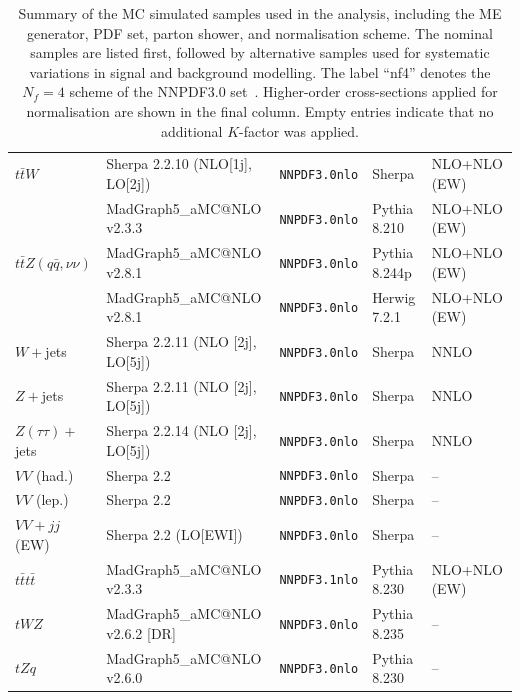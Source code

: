\begin{table}[h!]
\begin{tabular}{|lllll|}
$t\bar{t}W$   & Sherpa 2.2.10 (NLO[1j], LO[2j]) & \verb|NNPDF3.0nlo| & Sherpa & NLO+NLO (EW) \\
              & MadGraph5\_aMC@NLO v2.3.3 & \verb|NNPDF3.0nlo| & Pythia 8.210 & NLO+NLO (EW) \\
$t\bar{t}Z (q\bar{q}, \nu\nu)$ & MadGraph5\_aMC@NLO v2.8.1 & \verb|NNPDF3.0nlo| & Pythia 8.244p & NLO+NLO (EW) \\
              & MadGraph5\_aMC@NLO v2.8.1 & \verb|NNPDF3.0nlo| & Herwig 7.2.1 & NLO+NLO (EW) \\
$W+$jets      & Sherpa 2.2.11 (NLO [2j], LO[5j]) & \verb|NNPDF3.0nlo| & Sherpa & NNLO \\
$Z+$jets      & Sherpa 2.2.11 (NLO [2j], LO[5j]) & \verb|NNPDF3.0nlo| & Sherpa & NNLO \\
$Z(\tau\tau)+$jets & Sherpa 2.2.14 (NLO [2j], LO[5j]) & \verb|NNPDF3.0nlo| & Sherpa & NNLO \\
$VV$ (had.)   & Sherpa 2.2 & \verb|NNPDF3.0nlo| & Sherpa & -- \\
$VV$ (lep.)   & Sherpa 2.2 & \verb|NNPDF3.0nlo| & Sherpa & -- \\
$VV+jj$ (EW)  & Sherpa 2.2 (LO[EWI]) & \verb|NNPDF3.0nlo| & Sherpa & -- \\
$t\bar{t}t\bar{t}$ & MadGraph5\_aMC@NLO v2.3.3 & \verb|NNPDF3.1nlo| & Pythia 8.230 & NLO+NLO (EW) \\
$tWZ$         & MadGraph5\_aMC@NLO v2.6.2 [DR] & \verb|NNPDF3.0nlo| & Pythia 8.235 & -- \\
$tZq$         & MadGraph5\_aMC@NLO v2.6.0 & \verb|NNPDF3.0nlo| & Pythia 8.230 & -- \\
\hline\hline
\end{tabular}
\caption{Summary of the MC simulated samples used in the analysis, including the ME generator, PDF set, parton shower, and normalisation scheme. The nominal samples are listed first, followed by alternative samples used for systematic variations in signal and background modelling. The label ``nf4'' denotes the $N_f=4$ scheme of the NNPDF3.0 set~\cite{pdfs_run_2}. Higher-order cross-sections applied for normalisation are shown in the final column. Empty entries indicate that no additional $K$-factor was applied.}
\label{tab:MC_samples}
\end{table}
